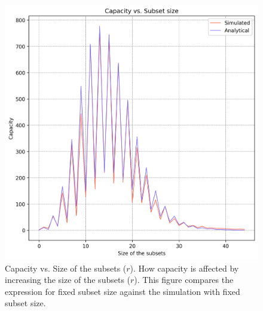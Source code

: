     \begin{figure}%
        \centering
        \includegraphics[scale=0.85]{figures/cap-vs-r.png}
        \caption[Capacity vs. Size of the subsets ($r$)]{Capacity vs. Size of the subsets ($r$). \textmd{How capacity is affected by increasing the size of the subsets ($r$). This figure compares the expression for fixed subset size against the simulation with fixed subset size.}}
        \label{figure:cap-vs-r}
        \end{figure}


